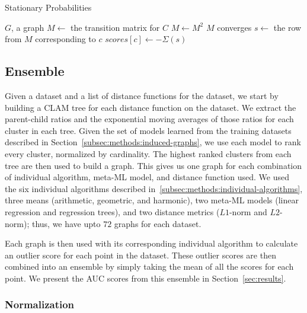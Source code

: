 \begin{algorithm}[h]
    \caption{Stationary Probabilities}
    \label{alg:sp}
\begin{algorithmic}[1]
    \REQUIRE $G$, a graph
        \STATE $M \gets$ the transition matrix for $C$
        \REPEAT
            \STATE $M \gets M^2$
        \UNTIL $M$ converges
            \STATE $s \gets $ the row from $M$ corresponding to $c$
            \STATE $scores[c] \gets -\Sigma(s)$ 
        \ENDFOR
    \ENDFOR
\end{algorithmic}
\end{algorithm}


\subsection{Ensemble}
\label{subsec:methods:ensemble}


Given a dataset and a list of distance functions for the dataset, we start by building a CLAM tree for each distance function on the dataset.
We extract the parent-child ratios and the exponential moving averages of those ratios for each cluster in each tree.
Given the set of models learned from the training datasets described in Section~\ref{subsec:methods:induced-graphs}, we use each model to rank every cluster, normalized by cardinality.
The highest ranked clusters from each tree are then used to build a graph.
This gives us one graph for each combination of individual algorithm, meta-ML model, and distance function used.
We used the six individual algorithms described in~\ref{subsec:methods:individual-algorithms}, three means (arithmetic, geometric, and harmonic), two meta-ML models (linear regression and regression trees), and two distance metrics ($L1$-norm and $L2$-norm);
thus, we have upto $72$ graphs for each dataset.

Each graph is then used with its corresponding individual algorithm to calculate an outlier score for each point in the dataset.
These outlier scores are then combined into an ensemble by simply taking the mean of all the scores for each point.
We present the AUC scores from this ensemble in Section~\ref{sec:results}.

\subsubsection{Normalization}
\label{subsubsec:methods:normalization}

